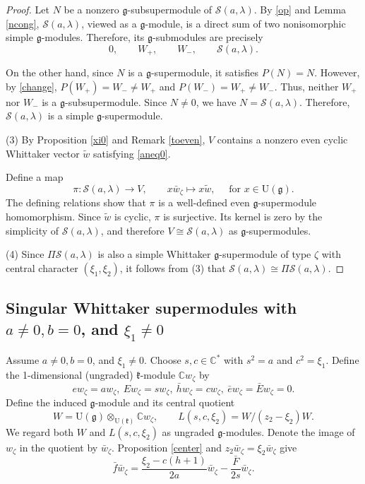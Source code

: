 \documentclass[a4paper,10pt]{article}
\theoremstyle{definition}
\theoremstyle{plain}
\theoremstyle{remark}
\theoremstyle{mystyle}
\numberwithin{equation}{section}
\begin{document}
\begin{proof}
    Let $N$ be a nonzero $\mathfrak g$-subsupermodule of $\mathcal {S}(a,\lambda)$. By \eqref{op} and Lemma \ref{ncong}, $\mathcal {S}(a,\lambda)$, viewed as a $\mathfrak g$-module, is a direct sum of two nonisomorphic simple $\mathfrak g$-modules. Therefore, its $\mathfrak g$-submodules are precisely 
    $$
    0,\qquad W_+,\qquad W_-,\qquad  \mathcal {S}(a,\lambda).
    $$
    
    On the other hand, since $N$ is a $\mathfrak g$-supermodule, it satisfies $P(N)=N$. However, by \eqref{change}, $P(W_+)=W_-\neq W_+$ and $P(W_-)=W_+ \neq W_-$. Thus, neither \(W_+\) nor \(W_-\) is a $\mathfrak g$-subsupermodule. Since \(N\neq0\), we have $N=\mathcal {S}(a,\lambda)$. Therefore, $\mathcal {S}(a,\lambda)$ is a simple $\mathfrak g$-supermodule.

    (3) By Proposition \ref{xi0} and Remark \ref{toeven}, $V$ contains a nonzero even cyclic Whittaker vector $\widetilde w$ satisfying \eqref{aneq0}.

    Define a map
    \[
        \pi:\mathcal {S}(a,\lambda)\to V,\qquad x\bar w_{\zeta}\mapsto x\widetilde w,\quad \text{ for } x\in \mathrm U(\mathfrak g).
    \]
    The defining relations show that \(\pi\) is a well-defined even $\mathfrak g$-supermodule homomorphism. Since \(\widetilde w\) is cyclic, \(\pi\) is surjective. Its kernel is zero by the simplicity of \(\mathcal {S}(a,\lambda)\), and therefore \(V\cong \mathcal {S}(a,\lambda)\) as $\mathfrak g$-supermodules.

    (4) Since $\Pi \mathcal {S}(a,\lambda)$ is also a simple Whittaker $\mathfrak g$-supermodule of type $\zeta$ with central character $(\xi_1,\xi_2)$, it follows from (3) that \(\mathcal {S}(a,\lambda)\cong\Pi \mathcal {S}(a,\lambda)\).
\end{proof}
\subsection{Singular Whittaker supermodules with $a\neq 0,b=0$, and $\xi_1\neq 0$}\label{s32}
Assume $a\neq 0,b=0$, and $\xi_1\neq 0$. Choose $s,c\in \mathbb C^*$ with $s^2=a$ and $c^2=\xi_1$. Define the 1-dimensional (ungraded) $\mathfrak k$-module $\mathbb Cw_{\zeta}$ by 
$$
ew_{\zeta}=aw_{\zeta},\ Ew_{\zeta}=sw_{\zeta},\ \bar hw_{\zeta}=cw_{\zeta},\ \bar ew_{\zeta}=\bar Ew_{\zeta}=0.
$$
Define the induced $\mathfrak g$-module and its central quotient
$$
W=\mathrm U(\mathfrak g)\otimes_{\mathrm U(\mathfrak k)}\mathbb Cw_{\zeta},\qquad L(s,c,\xi_2)=W/(z_2-\xi_2)W.
$$
We regard both $W$ and $L(s,c,\xi_2)$ as ungraded $\mathfrak g$-modules.
Denote the image of $w_{\zeta}$ in the quotient by $\bar w_{\zeta}$. Proposition \ref{center} and $z_2\bar w_{\zeta}=\xi_2\bar w_{\zeta}$ give
\begin{equation*}
    \bar f\bar w_{\zeta}=\frac{\xi_2-c(h+1)}{2a}\bar w_{\zeta}-\frac{\bar F}{2s}\bar w_{\zeta}.
\end{equation*}
\end{document}
